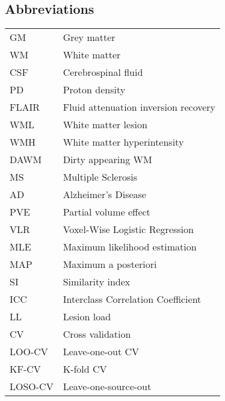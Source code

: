 \begin{singlespacing}
\tableofcontents
\newpage
\listoffigures
\newpage
\listoftables
\newpage
\subsection*{Abbreviations}
\begin{table}[H]
  \begin{tabular}{ll}
  	\toprule
  	GM      & Grey matter                          \\
  	WM      & White matter                         \\
  	CSF     & Cerebrospinal fluid                  \\
  	PD      & Proton density                       \\
  	FLAIR   & Fluid attenuation inversion recovery \\
  	WML     & White matter lesion                  \\
  	WMH     & White matter hyperintensity          \\
  	DAWM    & Dirty appearing WM                   \\
  	MS      & Multiple Sclerosis                   \\
  	AD      & Alzheimer's Disease                  \\
  	PVE     & Partial volume effect                \\
  	VLR     & Voxel-Wise Logistic Regression       \\
  	MLE     & Maximum likelihood estimation        \\
  	MAP     & Maximum a posteriori                 \\
  	SI      & Similarity index                     \\
  	ICC     & Interclass Correlation Coefficient   \\
  	LL      & Lesion load                          \\
  	CV      & Cross validation                     \\
  	LOO-CV  & Leave-one-out CV                     \\
  	KF-CV   & K-fold CV                            \\
  	LOSO-CV & Leave-one-source-out                 \\

\end{tabular}
\end{table}
\end{singlespacing}
